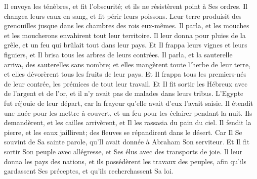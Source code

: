 {\VERSE Il envoya les ténèbres, et fit l'obscurité; et ils ne résistèrent point à Ses ordres. \EVERSE
\VERSE Il changea leurs eaux en sang, et fit périr leurs poissons. \EVERSE
\VERSE Leur terre produisit des grenouilles jusque dans les chambres des rois eux-mêmes. \EVERSE
\VERSE Il parla, et les mouches et les moucherons envahirent tout leur territoire. \EVERSE
\VERSE Il leur donna pour pluies de la grêle, et un feu qui brûlait tout dans leur pays. \EVERSE
\VERSE Et Il frappa leurs vignes et leurs figuiers, et Il brisa tous les arbres de leurs contrées. \EVERSE
\VERSE Il parla, et la sauterelle arriva, des sauterelles sans nombre; \EVERSE
\VERSE et elles mangèrent toute l'herbe de leur terre, et elles dévorèrent tous les fruits de leur pays. \EVERSE
\VERSE Et Il frappa tous les premiers-nés de leur contrée, les prémices de tout leur travail. \EVERSE
\VERSE Et Il fit sortir les Hébreux avec de l'argent et de l'or, et il n'y avait pas de malades dans leurs tribus. \EVERSE
\VERSE L'Egypte fut réjouie de leur départ, car la frayeur qu'elle avait d'eux l'avait saisie. \EVERSE
\VERSE Il étendit une nuée pour les mettre à couvert, et un feu pour les éclairer pendant la nuit. \EVERSE
\VERSE Ils demandèrent, et les cailles arrivèrent, et Il les rassasia du pain du ciel. \EVERSE
\VERSE Il fendit la pierre, et les eaux jaillirent; des fleuves se répandirent dans le désert. \EVERSE
\VERSE Car Il Se souvint de Sa sainte parole, qu'Il avait donnée à Abraham Son serviteur. \EVERSE
\VERSE Et Il fit sortir Son peuple avec allégresse, et Ses élus avec des transports de joie. \EVERSE
\VERSE Il leur donna les pays des nations, et ils possédèrent les travaux des peuples, \EVERSE
\VERSE afin qu'ils gardassent Ses préceptes, et qu'ils recherchassent Sa loi.

}
